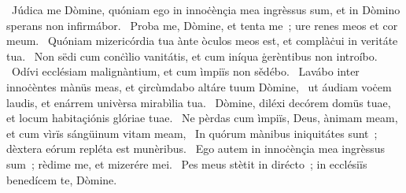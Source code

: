 ~Júdica me Dòmine, quóniam ego in innoċènçia mea ingrèssus sum, et in Dòmino sperans non infirmábor. 
~Proba me, Dòmine, et tenta me~; ure renes meos et cor meum. 
~Quóniam mizericórdia tua ànte òculos meos est, et complàċui in veritáte tua. 
~Non sëdi cum conċìlio vanitátis, et cum iníqua ġerèntibus non introíbo. 
~Odívi ecclésiam malignàntium, et cum ìmpiïs non sědébo. 
~Lavábo inter innoċèntes mànüs meas, et çircùmdabo altáre tuum Dòmine, 
~ut áudiam voċem laudis, et enárrem univèrsa mirabìlia tua. 
~Dòmine, diléxi decórem domüs tuae, et locum habitaçiónis glóriae tuae. 
~Ne pèrdas cum ìmpiïs, Deus, ànimam meam, et cum vìrïs sángüinum vitam meam, 
~In quórum mànibus iniquitátes sunt~; dèxtera eórum repléta est munèribus. 
~Ego autem in innoċènçia mea ingrèssus sum~; rèdime me, et mizerére mei. 
~Pes meus stètit in dirécto~; in ecclésiïs benedícem te, Dòmine. 
